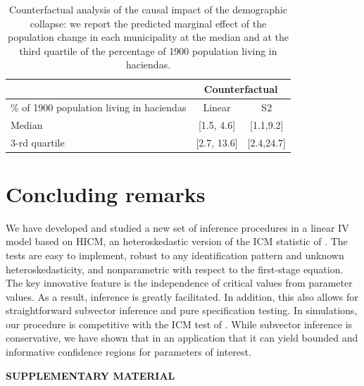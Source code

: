 \documentclass[12pt]{article}
\newcommand{\1}{\mathbf{1}}
\begin{document}
\begin{table}[ht]
\begin{center}
\begin{tabular}{lcc}
\hline
& \multicolumn{2}{c}{Counterfactual} \\ \hline
\% of 1900 population living in haciendas & Linear & S2  \\ \hline
Median       & [1.5, 4.6]  & [1.1,9.2]\\ \hline
3-rd quartile & [2.7, 13.6] & [2.4,24.7] \\ \hline
\end{tabular}
\caption{\small Counterfactual analysis of the causal impact of the
demographic collapse: we report the predicted marginal effect of the
population change in each municipality  at the median and at the third
quartile of the percentage of 1900 population living in haciendas.}
\label{table:Mexico counterfactual}
\end{center}
\end{table}

\section{Concluding remarks} \label{sec.concl}

We have developed and studied a new set of inference procedures in a
linear IV model based on HICM, an heteroskedastic version of the ICM
statistic of \cite{antoine_identification-robust_2023}.  The tests are
easy to implement, robust to any identification pattern and unknown
heteroskedasticity, and nonparametric with respect to the first-stage
equation. The key innovative feature is the independence of critical
values from parameter values.  As a result, inference is greatly
facilitated. In addition, this also allows for straightforward
subvector inference and pure specification testing.  In simulations,
our procedure is competitive with the ICM test of
\cite{antoine_identification-robust_2023}.  While subvector inference
is conservative, we have shown that in an application that it can
yield bounded and informative confidence regions for parameters of
interest.

\medskip


\newpage
\appendix

\label{supplementary-material}

\begin{center}
{\large\bf SUPPLEMENTARY MATERIAL}
\end{center}
\end{document}

